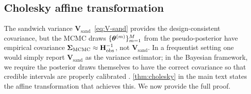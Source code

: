 
\subsection{Cholesky affine transformation}
\label{smc:cholesky}

The sandwich variance $\mathbf{V}_{\mathrm{sand}}$~\eqref{eq:V-sand}
provides the design-consistent covariance, but the MCMC draws
$\{\boldsymbol{\theta}^{(m)}\}_{m=1}^M$ from the pseudo-posterior have empirical
covariance $\boldsymbol{\Sigma}_{\mathrm{MCMC}} \approx \mathbf{H}_{\mathrm{obs}}^{-1}$,
not $\mathbf{V}_{\mathrm{sand}}$.  In a frequentist setting one would simply
report $\mathbf{V}_{\mathrm{sand}}$ as the variance estimator; in the
Bayesian framework, we require the posterior draws themselves to have the
correct covariance so that credible intervals are properly calibrated
\citep{WilliamsSavitsky2021}.
\cref{thm:cholesky} in the main text states the affine transformation
that achieves this.  We now provide the full proof.


